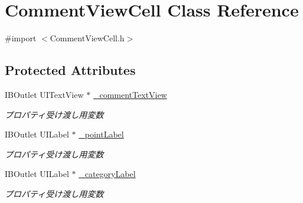 \hypertarget{interface_comment_view_cell}{
\section{CommentViewCell Class Reference}
\label{interface_comment_view_cell}
}


{\ttfamily \#import $<$CommentViewCell.h$>$}

\subsection*{Protected Attributes}
\begin{DoxyCompactItemize}
\item 
\hypertarget{interface_comment_view_cell_ac15e3cdcaace3833b5db0d2676876ed8}{
IBOutlet UITextView $\ast$ \hyperlink{interface_comment_view_cell_ac15e3cdcaace3833b5db0d2676876ed8}{\_\-commentTextView}}
\label{interface_comment_view_cell_ac15e3cdcaace3833b5db0d2676876ed8}

\begin{DoxyCompactList}\small\item\em プロパティ受け渡し用変数 \end{DoxyCompactList}\item 
\hypertarget{interface_comment_view_cell_a94ea33992b8ab292c5692635c0247048}{
IBOutlet UILabel $\ast$ \hyperlink{interface_comment_view_cell_a94ea33992b8ab292c5692635c0247048}{\_\-pointLabel}}
\label{interface_comment_view_cell_a94ea33992b8ab292c5692635c0247048}

\begin{DoxyCompactList}\small\item\em プロパティ受け渡し用変数 \end{DoxyCompactList}\item 
\hypertarget{interface_comment_view_cell_a1bd1f6ac5b060cfc8be5c5907bfb79ac}{
IBOutlet UILabel $\ast$ \hyperlink{interface_comment_view_cell_a1bd1f6ac5b060cfc8be5c5907bfb79ac}{\_\-categoryLabel}}
\label{interface_comment_view_cell_a1bd1f6ac5b060cfc8be5c5907bfb79ac}

\begin{DoxyCompactList}\small\item\em プロパティ受け渡し用変数 \end{DoxyCompactList}\end{DoxyCompactItemize}
